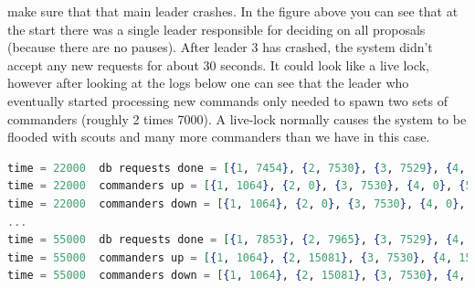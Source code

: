 \documentclass[11pt]{article}
\begin{document}
make sure that that main leader crashes. In the figure above you can see that
at the start there was a single leader responsible for deciding on all
proposals (because there are no pauses). After leader 3 has crashed, the system
didn't accept any new requests for about 30 seconds. It could look like a live
lock, however after looking at the logs below one can see that the leader who
eventually started processing new commands only needed to
spawn two sets of commanders (roughly 2 times 7000). A live-lock normally causes the system to be
flooded with scouts and many more commanders than we have in this case.
\begin{lstlisting}[language=elixir, caption={Commanders spawned before starting to make progress.},captionpos=b]
time = 22000  db requests done = [{1, 7454}, {2, 7530}, {3, 7529}, {4, 7422}, {5, 6967}]
time = 22000  commanders up = [{1, 1064}, {2, 0}, {3, 7530}, {4, 0}, {5, 1063}]
time = 22000  commanders down = [{1, 1064}, {2, 0}, {3, 7530}, {4, 0}, {5, 1063}]
...
time = 55000  db requests done = [{1, 7853}, {2, 7965}, {3, 7529}, {4, 7771}, {5, 6967}]
time = 55000  commanders up = [{1, 1064}, {2, 15081}, {3, 7530}, {4, 15514}, {5, 1063}]
time = 55000  commanders down = [{1, 1064}, {2, 15081}, {3, 7530}, {4, 15513}, {5, 1063}]
\end{lstlisting}
\end{document}
